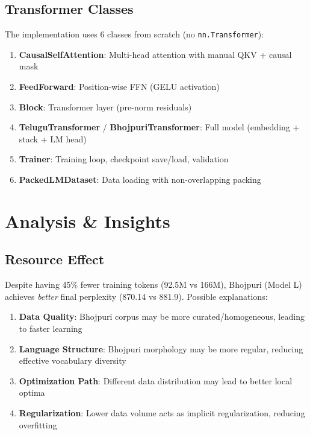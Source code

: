 \documentclass[11pt,a4paper]{article}
\begin{document}
\subsection{Transformer Classes}

The implementation uses 6 classes from scratch (no \texttt{nn.Transformer}):

\begin{enumerate}
    \item \textbf{CausalSelfAttention}: Multi-head attention with manual QKV + causal mask
    \item \textbf{FeedForward}: Position-wise FFN (GELU activation)
    \item \textbf{Block}: Transformer layer (pre-norm residuals)
    \item \textbf{TeluguTransformer} / \textbf{BhojpuriTransformer}: Full model (embedding + stack + LM head)
    \item \textbf{Trainer}: Training loop, checkpoint save/load, validation
    \item \textbf{PackedLMDataset}: Data loading with non-overlapping packing
\end{enumerate}

\section{Analysis \& Insights}

\subsection{Resource Effect}

Despite having 45\% fewer training tokens (92.5M vs 166M), Bhojpuri (Model L) achieves \textit{better} final perplexity (870.14 vs 881.9). Possible explanations:

\begin{enumerate}
    \item \textbf{Data Quality}: Bhojpuri corpus may be more curated/homogeneous, leading to faster learning
    \item \textbf{Language Structure}: Bhojpuri morphology may be more regular, reducing effective vocabulary diversity
    \item \textbf{Optimization Path}: Different data distribution may lead to better local optima
    \item \textbf{Regularization}: Lower data volume acts as implicit regularization, reducing overfitting
\end{enumerate}
\end{document}
